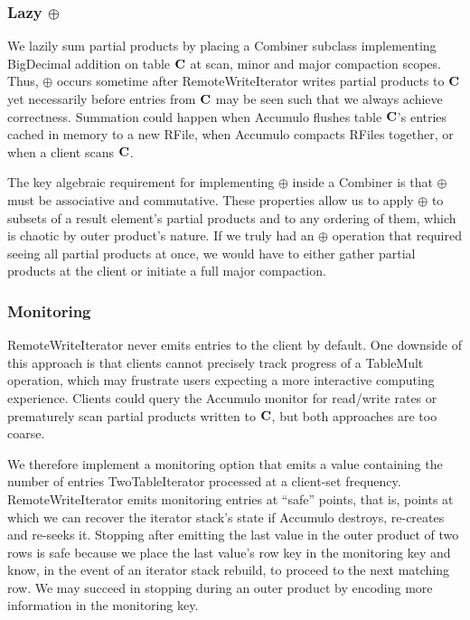 \subsubsection{Lazy $\oplus$}
We lazily sum partial products by placing a Combiner subclass implementing BigDecimal addition 
on table $\mathbf{C}$ at scan, minor and major compaction scopes.
Thus, $\oplus$ occurs sometime after RemoteWriteIterator writes partial products to $\mathbf{C}$
yet necessarily before entries from $\mathbf{C}$ may be seen such that we always achieve correctness.
Summation could happen when Accumulo flushes table $\mathbf{C}$'s entries cached in memory to a new RFile, 
when Accumulo compacts RFiles together, or when a client scans $\mathbf{C}$. 

The key algebraic requirement for implementing $\oplus$ inside a Combiner
is that $\oplus$ must be associative and commutative.
These properties allow us to apply $\oplus$ to subsets of a result element's partial products 
and to any ordering of them, which is chaotic by outer product's nature.
If we truly had an $\oplus$ operation that required seeing all partial products at once,
we would have to either gather partial products at the client or initiate a full major compaction.

\subsubsection{Monitoring}
RemoteWriteIterator never emits entries to the client by default. 
One downside of this approach is that clients cannot precisely track progress of a TableMult operation,
which may frustrate users expecting a more interactive computing experience.
Clients could query the Accumulo monitor for read/write rates 
or prematurely scan partial products written to $\mathbf{C}$, but both approaches are too coarse.

We therefore implement a monitoring option that emits a value
containing the number of entries TwoTableIterator processed
at a client-set frequency.
RemoteWriteIterator emits monitoring entries at ``safe'' points, that is,
points at which we can recover the iterator stack's state 
if Accumulo destroys, re-creates and re-seeks it.
Stopping after emitting the last value in the outer product of two rows is safe 
because we place the last value's row key in the monitoring key and know, 
in the event of an iterator stack rebuild, to proceed to the next matching row.
We may succeed in stopping during an outer product 
by encoding more information in the monitoring key.


